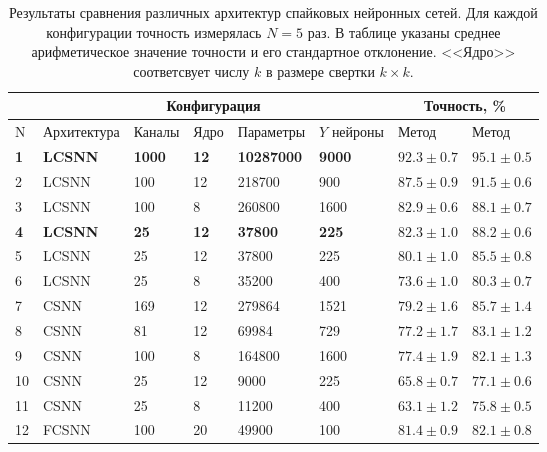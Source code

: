 \documentclass[a4paper]{article}
\begin{document}
\begin{table}
 \caption{Результаты сравнения различных архитектур спайковых нейронных сетей. Для каждой конфигурации точность измерялась $N=5$ раз. В таблице указаны среднее арифметическое значение точности и его стандартное отклонение. <<Ядро>> соответсвует числу $k$ в размере свертки $k\times k$.}
\begin{center}
\begin{adjustwidth}{-1cm}{}
\begin{tabular}{|l|l|l|l|l|l|p{2.2cm}|p{2.2cm}|}
\hline
&\multicolumn{5}{c|}{Конфигурация} & \multicolumn{2}{c|}{Точность, \%}\\
\hline
N & Архитектура & Каналы & Ядро & Параметры & $Y$ нейроны & {Метод \footnotemark[1]} & {Метод \footnotemark[2]} \\
\hline\hline
{\textbf{1}} & {\textbf{LCSNN}} & {\textbf{1000}} & {\textbf{12}} & {\textbf{10287000}} & {\textbf{9000}} & {$\mathbf{92.3 \pm 0.7}$} & {$\mathbf{95.1 \pm 0.5}$}\\
\hline
2 & {LCSNN} & {100} & {12} & {218700} & {900} & {$87.5 \pm 0.9$} & {$91.5 \pm 0.6$}\\
\hline
3 & {LCSNN} & {100} & {8} & {260800} & {1600} & {$82.9 \pm 0.6$} & {$88.1 \pm 0.7$}\\
\hline
{\textbf{4}} & {\textbf{LCSNN\footnotemark[3]}} & {\textbf{25}} & {\textbf{12}} & {\textbf{37800}} & {\textbf{225}} & {$\mathbf{82.3 \pm 1.0}$} & {$\mathbf{88.2 \pm 0.6}$}\\
\hline
5 & {LCSNN} & {25} & {12} & {37800} & {225} & {$80.1 \pm 1.0$} & {$85.5 \pm 0.8$}\\
\hline
6 & {LCSNN} & {25} & {8} & {35200} & {400} & {$73.6 \pm 1.0$} & {$80.3 \pm 0.7$}\\
\hline\hline
7 & {CSNN} & {169} & {12} & {279864} & {1521} & {$79.2 \pm 1.6$} & {$85.7 \pm 1.4$}\\
\hline
8 & {CSNN} & {81} & {12} & {69984} & {729} & {$77.2 \pm 1.7$} & {$83.1 \pm 1.2$}\\
\hline
9 & {CSNN} & {100} & {8} & {164800} & {1600} & {$77.4 \pm 1.9$} & {$82.1 \pm 1.3$}\\
\hline
10 & {CSNN} & {25} & {12} & {9000} & {225} & {$65.8 \pm 0.7$} & {$77.1 \pm 0.6$}\\
\hline
11 & {CSNN} & {25} & {8} & {11200} & {400} & {$63.1 \pm 1.2$} & {$75.8 \pm 0.5$}\\
\hline\hline
12 & {FCSNN} & {100} & {20} & {49900} & {100} & {$81.4 \pm 0.9$} & {$82.1 \pm 0.8$}\\
\hline
\end{tabular}
\end{adjustwidth}
\end{center}
 \label{results}
\end{table}
\end{document}
